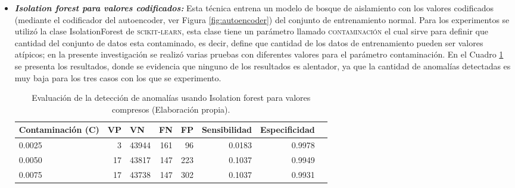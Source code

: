 \begin{itemize}
\item \textbf{\textit{Isolation forest para valores codificados: }}Esta t\'{e}cnica entrena un modelo de bosque de aislamiento con los valores codificados (mediante el codificador del autoencoder, ver Figura \ref{fig:autoencoder}) del conjunto de entrenamiento normal. Para los experimentos se utiliz\'{o} la clase IsolationForest de \textsc{scikit-learn}, esta clase tiene un par\'{a}metro llamado \textsc{contaminaci\'{o}n} el cual sirve para definir que cantidad del conjunto de datos esta contaminado, es decir, define que cantidad de los datos de entrenamiento pueden ser valores at\'{i}picos; en la presente investigaci\'{o}n se realiz\'{o} varias pruebas con diferentes valores para el par\'{a}metro contaminaci\'{o}n. En el Cuadro \ref{table:evaluacion_IF_encoded} se presenta los resultados, donde se evidencia que ninguno de los resultados es alentador, ya que la cantidad de anomal\'{i}as detectadas es muy baja para los tres casos con los que se experimento.

\begin{table}[H]
\centering
\begin{center}
\begin{tabular}{|l|r|r|r|r|r|r|r|}
\hline
\textbf{Contaminaci\'{o}n (C)} & \multicolumn{1}{l|}{\textbf{VP}} & \multicolumn{1}{l|}{\textbf{VN}}& \multicolumn{1}{l|}{\textbf{FN}}& \multicolumn{1}{l|}{\textbf{FP}} & \multicolumn{1}{l|}{\textbf{Sensibilidad}} & \multicolumn{1}{l|}{\textbf{Especificidad}} \\ \hline
0.0025 & \cellcolor[HTML]{AADD99} 3 & \cellcolor[HTML]{AADD99} 43944 & \cellcolor[HTML]{FFCE93} 161 & \cellcolor[HTML]{FFCE93} 96 & 0.0183 & 0.9978 \\ \hline
0.0050 & \cellcolor[HTML]{AADD99} 17 & \cellcolor[HTML]{AADD99} 43817 & \cellcolor[HTML]{FFCE93} 147 & \cellcolor[HTML]{FFCE93} 223 & 0.1037 & 0.9949 \\ \hline
0.0075 & \cellcolor[HTML]{AADD99} 17 & \cellcolor[HTML]{AADD99} 43738 & \cellcolor[HTML]{FFCE93} 147 & \cellcolor[HTML]{FFCE93} 302 & 0.1037 & 0.9931 \\ \hline
\end{tabular}
\end{center}
\caption{Evaluaci\'{o}n de la detecci\'{o}n de anomal\'{i}as usando Isolation forest para valores compresos (Elaboraci\'{o}n propia).}
\label{table:evaluacion_IF_encoded}
\end{table}


\end{itemize}
